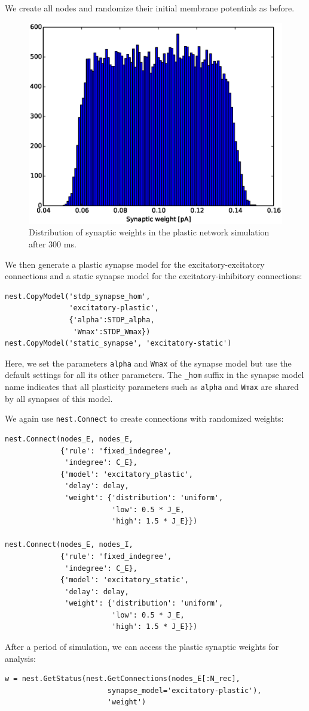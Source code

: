 \documentclass{article}
\begin{document}
We create all nodes and randomize their initial membrane potentials
as before.
%
\begin{figure}[!tbp]
\centering
\includegraphics[width=0.7\linewidth]{figures/rand_plas_w.eps}
\caption{\label{nest:fig:plasticweights} Distribution of synaptic
  weights in the plastic network simulation after 300 ms.} 
\end{figure}
%
We then generate a plastic synapse model for the excitatory-excitatory
connections and a static synapse model for the excitatory-inhibitory
connections:
\begin{lstlisting}[name=brunel-plastic]
nest.CopyModel('stdp_synapse_hom',
               'excitatory-plastic',
               {'alpha':STDP_alpha,
                'Wmax':STDP_Wmax})
nest.CopyModel('static_synapse', 'excitatory-static')
\end{lstlisting}
Here, we set the parameters \lstinline!alpha! and \lstinline!Wmax!  of
the synapse model but use the default settings for all its other
parameters. The \lstinline!_hom! suffix in the synapse model name
indicates that all plasticity parameters such as \lstinline!alpha! and
\lstinline!Wmax! are shared by all synapses of this model.

We again use \lstinline!nest.Connect! to create connections with
randomized weights:
\begin{lstlisting}[name=brunel-plastic]
nest.Connect(nodes_E, nodes_E,
             {'rule': 'fixed_indegree', 
              'indegree': C_E},
             {'model': 'excitatory_plastic', 
              'delay': delay,
              'weight': {'distribution': 'uniform',
                         'low': 0.5 * J_E, 
                         'high': 1.5 * J_E}})

nest.Connect(nodes_E, nodes_I,
             {'rule': 'fixed_indegree', 
              'indegree': C_E},
             {'model': 'excitatory_static', 
              'delay': delay,
              'weight': {'distribution': 'uniform',
                         'low': 0.5 * J_E, 
                         'high': 1.5 * J_E}})
\end{lstlisting}
After a period of simulation, we can access the plastic synaptic
weights for analysis:
\begin{lstlisting}
w = nest.GetStatus(nest.GetConnections(nodes_E[:N_rec],
                        synapse_model='excitatory-plastic'),
                        'weight')
\end{lstlisting}
\end{document}
